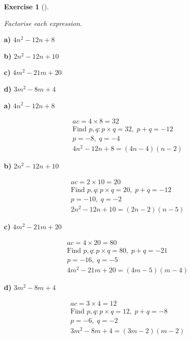 \documentclass[
  letterpaper,
  DIV=11,
  numbers=noendperiod]{scrreprt}
\theoremstyle{definition}
\newtheorem{exercise}{Exercise}[chapter]
\theoremstyle{remark}
\begin{document}
\begin{exercise}[]\protect\hypertarget{exr-u6-5}{}\label{exr-u6-5}

\emph{Factorise each expression.}

\textbf{a)} \(\displaystyle 4n^2 - 12n + 8\)

\textbf{b)} \(\displaystyle 2n^2 - 12n + 10\)

\textbf{c)} \(\displaystyle 4m^2 - 21m + 20\)

\textbf{d)} \(\displaystyle 3m^2 - 8m + 4\)

\begin{tcolorbox}[enhanced jigsaw, opacitybacktitle=0.6, coltitle=black, arc=.35mm, colframe=quarto-callout-tip-color-frame, colback=white, bottomrule=.15mm, left=2mm, colbacktitle=quarto-callout-tip-color!10!white, titlerule=0mm, opacityback=0, title=\textcolor{quarto-callout-tip-color}{\faLightbulb}\hspace{0.5em}{🔍 View Solutions}, leftrule=.75mm, breakable, rightrule=.15mm, bottomtitle=1mm, toptitle=1mm, toprule=.15mm]

\textbf{a)} \(\displaystyle 4n^2 - 12n + 8\)

\begin{align*}
ac = 4 \times 8 = 32 \\ \text{Find } p, q: p \times q = 32,\; p + q = -12 \\ p = -8,\; q = -4 \\ 4n^2 - 12n + 8 = (4n - 4)(n - 2)
\end{align*}

\textbf{b)} \(\displaystyle 2n^2 - 12n + 10\)

\begin{align*}
ac = 2 \times 10 = 20 \\ \text{Find } p, q: p \times q = 20,\; p + q = -12 \\ p = -10,\; q = -2 \\ 2n^2 - 12n + 10 = (2n - 2)(n - 5)
\end{align*}

\textbf{c)} \(\displaystyle 4m^2 - 21m + 20\)

\begin{align*}
ac = 4 \times 20 = 80 \\ \text{Find } p, q: p \times q = 80,\; p + q = -21 \\ p = -16,\; q = -5 \\ 4m^2 - 21m + 20 = (4m - 5)(m - 4)
\end{align*}

\textbf{d)} \(\displaystyle 3m^2 - 8m + 4\)

\begin{align*}
ac = 3 \times 4 = 12 \\ \text{Find } p, q: p \times q = 12,\; p + q = -8 \\ p = -6,\; q = -2 \\ 3m^2 - 8m + 4 = (3m - 2)(m - 2)
\end{align*}

\end{tcolorbox}

\end{exercise}
\end{document}
